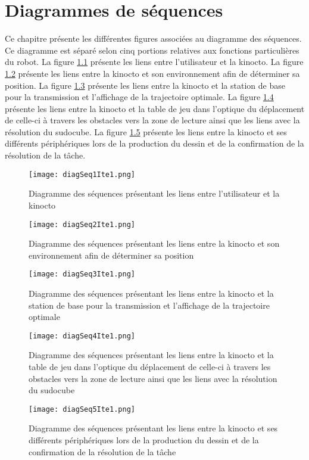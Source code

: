 


\chapter{Diagrammes de séquences}
\label{s:sequences}
Ce chapitre présente les différentes figures associées au diagramme des séquences. Ce diagramme est séparé selon cinq portions relatives aux fonctions particulières du robot. La figure \ref{fig:diagSeq1Ite1} présente les liens entre l'utilisateur et la kinocto. La figure \ref{diagSeq2Ite1} présente les liens entre la kinocto et son environnement afin de déterminer sa position. La figure \ref{diagSeq3Ite1} présente les liens entre la kinocto et la station de base pour la transmission et l'affichage de la trajectoire optimale. La figure \ref{diagSeq4Ite1} présente les liens entre la kinocto et la table de jeu dans l'optique du déplacement de celle-ci à travers les obstacles vers la zone de lecture ainsi que les liens avec la résolution du sudocube. La figure \ref{diagSeq5Ite1} présente les liens entre la kinocto et ses différents périphériques lors de la production du dessin et de la confirmation de la résolution de la tâche.
\begin{figure}[htb]
\centering
\texttt{[image: diagSeq1Ite1.png]}
\caption{Diagramme des séquences présentant les liens entre l'utilisateur et la kinocto}
\label{fig:diagSeq1Ite1} 
\end{figure}
\begin{figure}[htb]
\texttt{[image: diagSeq2Ite1.png]}
\caption{Diagramme des séquences présentant les liens entre la kinocto et son environnement afin de déterminer sa position}
\label{diagSeq2Ite1}
\end{figure}
\begin{figure}[htb]
\texttt{[image: diagSeq3Ite1.png]}
\caption{Diagramme des séquences présentant les liens entre la kinocto et la station de base pour la transmission et l'affichage de la trajectoire optimale}
\label{diagSeq3Ite1}
\end{figure}
\begin{figure}[htb]
\texttt{[image: diagSeq4Ite1.png]}
\caption{Diagramme des séquences présentant les liens entre la kinocto et la table de jeu dans l'optique du déplacement de celle-ci à travers les obstacles vers la zone de lecture ainsi que les liens avec la résolution du sudocube}
\label{diagSeq4Ite1}
\end{figure}
\begin{figure}[htb]
\texttt{[image: diagSeq5Ite1.png]}
\caption{Diagramme des séquences présentant les liens entre la kinocto et ses différents périphériques lors de la production du dessin et de la confirmation de la résolution de la tâche}
\label{diagSeq5Ite1}
\end{figure}
